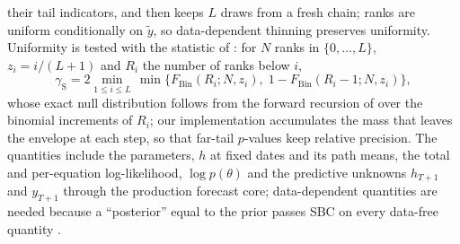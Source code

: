 their tail indicators, and then keeps $L$ draws from a fresh chain; ranks are uniform conditionally
on $\tilde y$, so data-dependent thinning preserves uniformity.
Uniformity is tested with the statistic of \citet{sailynoja2022graphical}: for $N$ ranks in
$\{0, \dots, L\}$, $z_i = i/(L + 1)$ and $R_i$ the number of ranks below $i$,
\begin{equation}\label{eq:gamma-sbc}
  \gamma_{\mathrm{S}} = 2\min_{1 \le i \le L}\,\min\bigl\{F_{\mathrm{Bin}}(R_i; N, z_i),\;
  1 - F_{\mathrm{Bin}}(R_i - 1; N, z_i)\bigr\},
\end{equation}
whose exact null distribution follows from the forward recursion of \citet{sailynoja2022graphical}
over the binomial increments of $R_i$; our implementation accumulates the mass that leaves the
envelope at each step, so that far-tail $p$-values keep relative precision. %
The quantities include the parameters, $h$ at fixed dates and its path means, the total and per-equation
log-likelihood, $\log p(\theta)$ and the predictive unknowns $h_{T+1}$ and $y_{T+1}$ through the
production forecast core; data-dependent quantities are needed because a ``posterior'' equal to the
prior passes SBC on every data-free quantity \citep[Section~3.4, Theorem~7]{modrak2025simulation}.

